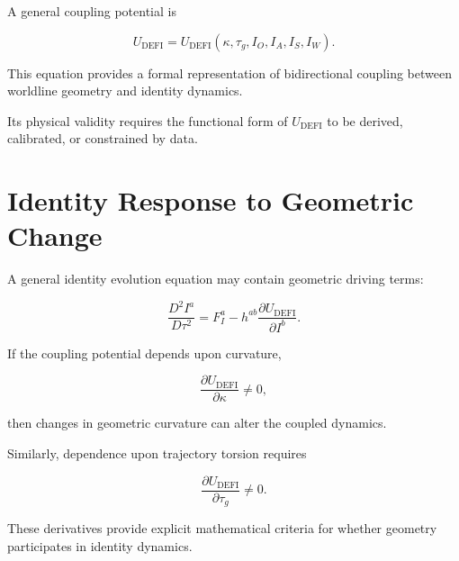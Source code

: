 \documentclass[12pt,oneside]{book}
\newcommand{\DEFI}{\mathrm{DEFI}}
\begin{document}
A general coupling potential is

\begin{equation}
    U_{\DEFI}
    =
    U_{\DEFI}
    \left(
        \kappa,
        \tau_g,
        I_O,
        I_A,
        I_S,
        I_W
    \right).
    \label{eq:identity-geometry-coupling-potential}
\end{equation}

This equation provides a formal representation of bidirectional
coupling between worldline geometry and identity dynamics.

Its physical validity requires the functional form of
\(U_{\DEFI}\) to be derived, calibrated, or constrained by data.


\section{Identity Response to Geometric Change}
\label{sec:identity-response-curvature}

A general identity evolution equation may contain geometric
driving terms:

\begin{equation}
    \frac{D^2I^a}{D\tau^2}
    =
    F_I^a
    -
    h^{ab}
    \frac{\partial U_{\DEFI}}
         {\partial I^b}.
    \label{eq:identity-geometric-response}
\end{equation}

If the coupling potential depends upon curvature,

\begin{equation}
    \frac{\partial U_{\DEFI}}
         {\partial \kappa}
    \neq
    0,
\end{equation}

then changes in geometric curvature can alter the coupled
dynamics.

Similarly, dependence upon trajectory torsion requires

\begin{equation}
    \frac{\partial U_{\DEFI}}
         {\partial \tau_g}
    \neq
    0.
\end{equation}

These derivatives provide explicit mathematical criteria for
whether geometry participates in identity dynamics.

\end{document}
